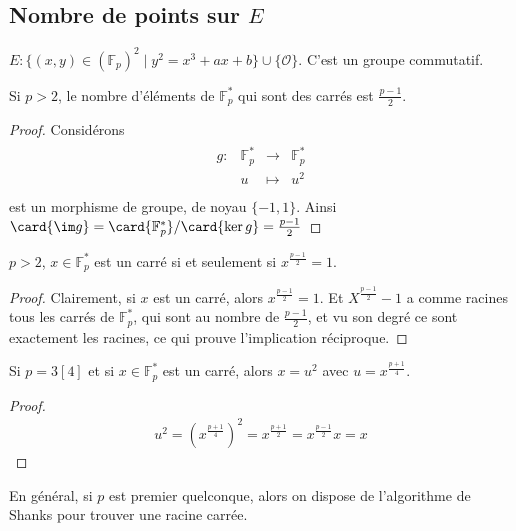         \subsection{Nombre de points sur $E$}
            $E : \{(x,y) \in (\mathbb{F}_p)^2 \mid y^2 = x^3 + ax + b\} \cup \{\mathcal{O}\}$. C'est un groupe commutatif.
            \begin{prop}
                Si $p > 2$, le nombre d'éléments de $\mathbb{F}_p^*$ qui sont des carrés est $\frac {p-1}2$.
            \end{prop}
            \begin{proof}
                Considérons
                \begin{align*}
                    \begin{array}{cccc}
                        g : & \mathbb{F}_p^* & \to & \mathbb{F}_p^* \\
                        & u & \mapsto & u^2 \\
                    \end{array}
                \end{align*}
                est un morphisme de groupe, de noyau $\{-1, 1\}$. Ainsi $\card{\im g} = \card{\mathbb{F}_p^*} / \card{\ker g} = \frac{p - 1}2$
            \end{proof}
            \begin{prop}
                $p > 2$, $x \in \mathbb{F}_p^*$ est un carré si et seulement si $x^{\frac{p - 1}2} = 1$.
            \end{prop}
            \begin{proof}
                Clairement, si $x$ est un carré, alors $x^{\frac{p - 1}2} = 1$. Et $X^{\frac{p - 1}2} - 1$ a comme racines tous les carrés de $\mathbb{F}_p^*$, qui sont au nombre de $\frac{p - 1}2$, et vu son degré ce sont exactement les racines, ce qui prouve l'implication réciproque.
            \end{proof}
            \begin{prop}
                Si $p = 3 [4]$ et si $x \in \mathbb{F}_p^*$ est un carré, alors $x = u^2$ avec $u = x^{\frac{p + 1}4}$.
            \end{prop}
            \begin{proof}
                \begin{align*}
                    u^2 = \left( x^{\frac{p + 1}4} \right)^2 = x^{\frac{p + 1}2} = x^{\frac{p - 1}2} x = x
                \end{align*}
            \end{proof}
            \begin{remq}
                En général, si $p$ est premier quelconque, alors on dispose de l'algorithme de Shanks pour trouver une racine carrée.
            \end{remq}

